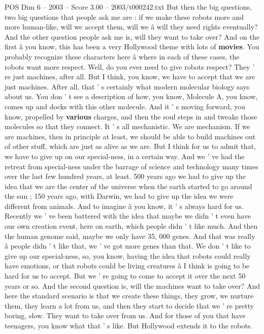 \begin{textsample}{POS Dim 6 – 2003 – Score 3.00 – 2003/t000242.txt}
But then the big questions, two big questions that people ask me are : if we make these robots more and more human-like, will we accept them, will we â will they need rights eventually?
And the other question people ask me is, will they want to take over?
And on the first â you know, this has been a very Hollywood theme with lots of \textbf{movies}.
You probably recognize these characters here â where in each of these cases, the robots want more respect.
Well, do you ever need to give robots respect?
They ' re just machines, after all.
But I think, you know, we have to accept that we are just machines.
After all, that ' s certainly what modern molecular biology says about us.
You don ' t see a description of how, you know, Molecule A, you know, comes up and docks with this other molecule.
And it ' s moving forward, you know, propelled by \textbf{various} charges, and then the soul steps in and tweaks those molecules so that they connect.
It ' s all mechanistic.
We are mechanism.
If we are machines, then in principle at least, we should be able to build machines out of other stuff, which are just as alive as we are.
But I think for us to admit that, we have to give up on our special-ness, in a certain way.
And we ' ve had the retreat from special-ness under the barrage of science and technology many times over the last few hundred years, at least. 500 years ago we had to give up the idea that we are the center of the universe when the earth started to go around the sun ; 150 years ago, with Darwin, we had to give up the idea we were different from animals.
And to imagine â you know, it ' s always hard for us.
Recently we ' ve been battered with the idea that maybe we didn ' t even have our own creation event, here on earth, which people didn ' t like much.
And then the human genome said, maybe we only have 35, 000 genes.
And that was really â people didn ' t like that, we ' ve got more genes than that.
We don ' t like to give up our special-ness, so, you know, having the idea that robots could really have emotions, or that robots could be living creatures â I think is going to be hard for us to accept.
But we ' re going to come to accept it over the next 50 years or so.
And the second question is, will the machines want to take over?
And here the standard scenario is that we create these things, they grow, we nurture them, they learn a lot from us, and then they start to decide that we ' re pretty boring, slow.
They want to take over from us.
And for those of you that have teenagers, you know what that ' s like.
But Hollywood extends it to the robots.

\end{textsample}
